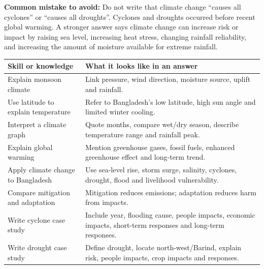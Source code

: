 \documentclass[11pt,a4paper]{article}
\begin{document}
\begin{skillbox}
\textbf{Common mistake to avoid:} Do not write that climate change ``causes all cyclones'' or ``causes all droughts''. Cyclones and droughts occurred before recent global warming. A stronger answer says climate change can increase risk or impact by raising sea level, increasing heat stress, changing rainfall reliability, and increasing the amount of moisture available for extreme rainfall.
\end{skillbox}

\newpage
{}

\begin{longtable}{p{4cm}p{10.9cm}}
\toprule
\textbf{Skill or knowledge} & \textbf{What it looks like in an answer}\\
\midrule
Explain monsoon climate & Link pressure, wind direction, moisture source, uplift and rainfall.\\
Use latitude to explain temperature & Refer to Bangladesh's low latitude, high sun angle and limited winter cooling.\\
Interpret a climate graph & Quote months, compare wet/dry season, describe temperature range and rainfall peak.\\
Explain global warming & Mention greenhouse gases, fossil fuels, enhanced greenhouse effect and long-term trend.\\
Apply climate change to Bangladesh & Use sea-level rise, storm surge, salinity, cyclones, drought, flood and livelihood vulnerability.\\
Compare mitigation and adaptation & Mitigation reduces emissions; adaptation reduces harm from impacts.\\
Write cyclone case study & Include year, flooding cause, people impacts, economic impacts, short-term responses and long-term responses.\\
Write drought case study & Define drought, locate north-west/Barind, explain risk, people impacts, crop impacts and responses.\\
\bottomrule
\end{longtable}
\end{document}
